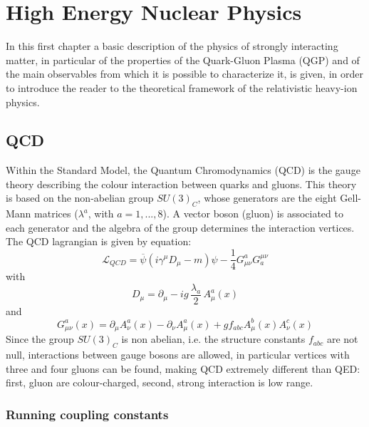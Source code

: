 \chapter{High Energy Nuclear Physics}
%
In this first chapter a basic description of the physics of strongly interacting matter, in particular of the properties of the Quark-Gluon Plasma (QGP) and of the main observables from which it is possible to characterize it, is given, in order to introduce the reader to the theoretical framework of the relativistic heavy-ion physics.
%
\section{QCD}
Within the Standard Model, the Quantum Chromodynamics (QCD) is the gauge theory describing the colour interaction between quarks and gluons. This theory is based on the non-abelian group $SU(3)_{C}$, whose generators are the eight Gell-Mann matrices ($\lambda^{a}$, with $a=1,...,8$). A vector boson (gluon) is associated to each generator and the algebra of the group determines the interaction vertices.\\
The QCD lagrangian is given by equation:
%
\begin{equation}
 \label{lQCD}
 \mathcal{L}_{QCD} = \overbar{\psi}(i\gamma^{\mu}D_{\mu}-m)\psi - \frac{1}{4} G^{a}_{\mu\nu}G_{a}^{\mu\nu}
\end{equation}
%
with
%
\begin{equation*}
  D_{\mu} = \partial_{\mu} - i g \, \frac{\lambda_{a}}{2} \, A^{a}_{\mu}(x)
\end{equation*}
%
and
%
\begin{equation*}
  G^{a}_{\mu\nu}(x)=\partial_{\mu}A^{a}_{\nu}(x)-\partial_{\nu}A^{a}_{\mu}(x)+ g f_{abc} A^{b}_{\mu}(x)A^{c}_{\nu}(x)
\end{equation*}
%
Since the group $SU(3)_{C}$ is non abelian, i.e. the structure constants $f_{abc}$ are not null, interactions between gauge bosons are allowed, in particular vertices with three and four gluons can be found, making QCD extremely different than QED: first, gluon are colour-charged, second, strong interaction is low range.

\subsection{Running coupling constants}

